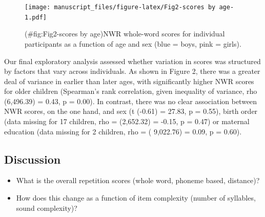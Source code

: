 \documentclass[english,,man,floatsintext]{apa6}
\begin{document}
\begin{figure}
\centering
\texttt{[image: manuscript\_files/figure-latex/Fig2-scores by age-1.pdf]}
\caption{(\#fig:Fig2-scores by age)NWR whole-word scores for individual
participants as a function of age and sex (blue = boys, pink = girls).}
\end{figure}

Our final exploratory analysis assessed whether variation in scores was
structured by factors that vary across individuals. As shown in Figure
2, there was a greater deal of variance in earlier than later ages, with
significantly higher NWR scores for older children (Spearman's rank
correlation, given inequality of variance, rho (6,496.39) = 0.43, p =
0.00). In contrast, there was no clear association between NWR scores,
on the one hand, and sex (t (-0.61) = 27.83, p = 0.55), birth order
(data missing for 17 children, rho = (2,652.32) = -0.15, p = 0.47) or
maternal education (data missing for 2 children, rho = ( 9,022.76) =
0.09, p = 0.60).

\subsection{Discussion}\label{discussion}

\begin{itemize}
\item
  What is the overall repetition scores (whole word, phoneme based,
  distance)?
\item
  How does this change as a function of item complexity (number of
  syllables, sound complexity)?
\end{itemize}
\end{document}
